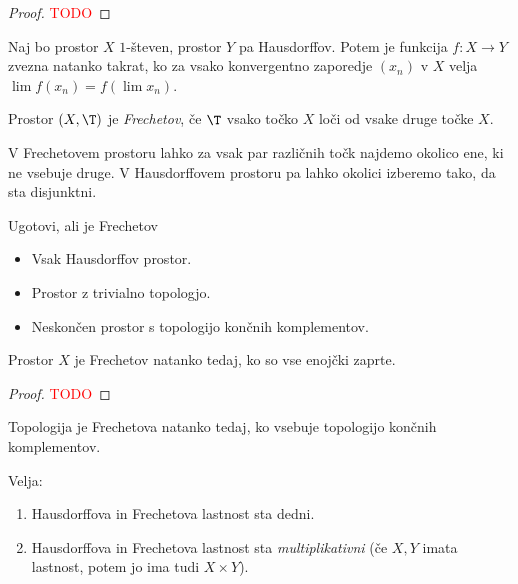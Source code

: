 \begin{proof}
    \textcolor{red}{TODO}
\end{proof}

\begin{izrek}
    Naj bo prostor $X$ $1$-števen, prostor $Y$ pa Hausdorffov. Potem je funkcija $f: X \to Y$ zvezna natanko takrat, ko za vsako konvergentno zaporedje $(x_n)$ v $X$ velja $\lim f(x_n) = f(\lim x_n)$.
\end{izrek}

\begin{definicija}
    Prostor $(X, \T)$ je \emph{Frechetov}, če $\T$ vsako točko $X$ loči od vsake druge točke $X$.
\end{definicija}

\begin{opomba}
    V Frechetovem prostoru lahko za vsak par različnih točk najdemo okolico ene, ki ne vsebuje druge. V Hausdorffovem prostoru pa lahko okolici izberemo tako, da sta disjunktni.
\end{opomba}

\begin{primer}
   Ugotovi, ali je Frechetov
    \begin{itemize}
        \item Vsak Hausdorffov prostor.
        \item Prostor z trivialno topologjo.
        \item Neskončen prostor s topologijo končnih komplementov.
    \end{itemize}
\end{primer}

\newpage
\begin{trditev}
    Prostor $X$ je Frechetov natanko tedaj, ko so vse enojčki zaprte.
\end{trditev}

\begin{proof}
    \textcolor{red}{TODO}
\end{proof}

\begin{opomba}
    Topologija je Frechetova natanko tedaj, ko vsebuje topologijo končnih komplementov.
\end{opomba}

\begin{trditev}
    Velja:
    \begin{enumerate}
        \item Hausdorffova in Frechetova lastnost sta dedni.
        \item Hausdorffova in Frechetova lastnost sta \emph{multiplikativni} (če $X, Y$ imata lastnost, potem jo ima tudi $X \times Y$).
    \end{enumerate}
\end{trditev}

